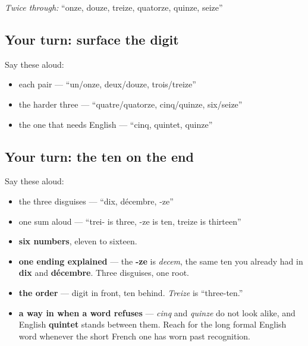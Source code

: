 \emph{Twice through:} \textquotedblleft{}onze, douze, treize, quatorze, quinze, seize\textquotedblright{}

\subsection*{Your turn: surface the digit}
Say these aloud:

\begin{itemize}
\raggedright
  \item each pair — \textquotedblleft{}un/onze, deux/douze, trois/treize\textquotedblright{}
  \item the harder three — \textquotedblleft{}quatre/quatorze, cinq/quinze, six/seize\textquotedblright{}
  \item the one that needs English — \textquotedblleft{}cinq, quintet, quinze\textquotedblright{}
\end{itemize}

\subsection*{Your turn: the ten on the end}
Say these aloud:

\begin{itemize}
\raggedright
  \item the three disguises — \textquotedblleft{}dix, décembre, -ze\textquotedblright{}
  \item one sum aloud — \textquotedblleft{}trei- is three, -ze is ten, treize is thirteen\textquotedblright{}
\end{itemize}

\begin{grammarlens}[title={What you've built this chapter}]
\begin{itemize}
\raggedright
  \item \textbf{six numbers}, eleven to sixteen.
  \item \textbf{one ending explained} — the \textbf{-ze} is \emph{decem}, the same ten you already had in \textbf{dix} and \textbf{décembre}. Three disguises, one root.
  \item \textbf{the order} — digit in front, ten behind. \emph{Treize} is \textquotedblleft{}three-ten.\textquotedblright{}
  \item \textbf{a way in when a word refuses} — \emph{cinq} and \emph{quinze} do not look alike, and English \textbf{quintet} stands between them. Reach for the long formal English word whenever the short French one has worn past recognition.
\end{itemize}
\end{grammarlens}

